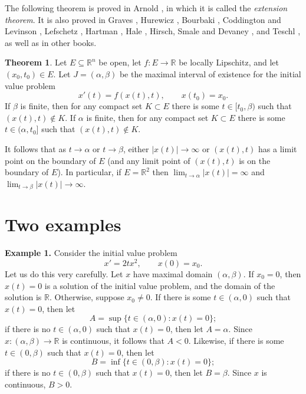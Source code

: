 \documentclass{article}
\theoremstyle{definition}
\newtheorem{theorem}{Theorem}
\begin{document}
The following theorem is proved in Arnold \cite[p.~53, Corollary 5]{arnold}, in which it is called the {\em extension theorem}. It is also proved in Graves \cite{graves}, Hurewicz \cite[p.~17, Corollary]{hurewicz}, Bourbaki \cite[p.~172, Theorem 2]{bourbaki}, Coddington and Levinson \cite[p.~47, Theorem 1.3]{coddington}, Lefschetz \cite[p.~35]{lefschetz}, Hartman \cite[p.~12, Theorem 3.1]{hartman}, Hale \cite{hale}, Hirsch, Smale and Devaney \cite[p.~398, Theorem]{hirsch}, and Teschl \cite[p.~53, Corollary 2.16]{teschl}, as well as in other books.

\begin{theorem}
\label{extension}
Let $E \subseteq \mathbb{R}^n$ be
open, let $f:E \to \mathbb{R}$ be locally Lipschitz, and let $(x_0,t_0) \in E$. Let
$J=(\alpha,\beta)$ be the maximal interval of existence for the initial value problem
\[
x'(t)=f(x(t),t), \qquad x(t_0)=x_0.
\]
If $\beta$ is finite, then for any compact set $K \subset E$ there is some
$t \in [t_0,\beta)$ such that $(x(t),t) \not \in K$. If $\alpha$ is finite, then for any compact set
$K \subset E$ there is some $t \in (\alpha,t_0]$ such that $(x(t),t) \not \in K$.
\end{theorem}

It follows
that as $t \to \alpha$ or $t \to \beta$,
either $|x(t)| \to \infty$ or $(x(t),t)$ has a limit point on the boundary of $E$ (and any limit point of $(x(t),t)$ is on the boundary of $E$). 
In particular, if $E=\mathbb{R}^2$ then $\lim_{t \to \alpha} |x(t)|=\infty$ and $\lim_{t \to \beta} |x(t)| \to \infty$.


\section{Two examples}
\textbf{Example 1.} Consider the initial value problem
\[
x'=2t x^2, \qquad x(0)=x_0.
\]
Let us do this very carefully.
Let $x$ have maximal domain $(\alpha,\beta)$. If $x_0=0$, then $x(t)=0$ is a solution of the initial value problem,
and the domain of the solution is $\mathbb{R}$. Otherwise, suppose $x_0 \neq 0$. If there is some $t \in (\alpha,0)$ such that $x(t)=0$, then let
\[
A=\sup \{t \in (\alpha,0): x(t)=0\};
\]
if there is no $t \in (\alpha,0)$ such that $x(t)=0$, then let $A=\alpha$. Since $x:(\alpha,\beta) \to \mathbb{R}$ is continuous, it follows that $A < 0$.
Likewise, if there is some $t \in (0,\beta)$ such that $x(t)=0$, then let
\[
B=\inf \{t \in (0,\beta): x(t)=0\};
\]
if there is no $t \in (0,\beta)$ such that $x(t)=0$, then let $B=\beta$. Since $x$ is continuous, $B > 0$.
\end{document}
